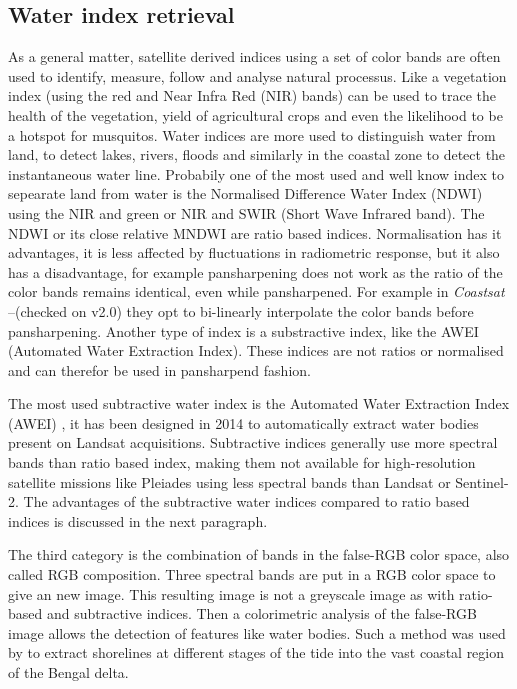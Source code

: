 \documentclass[remotesensing,article,submit,pdftex,moreauthors]{Definitions/mdpi}
\begin{document}
\subsection{Water index retrieval}
As a general matter, satellite derived indices using a set of color bands are often used to identify, measure, follow and analyse natural processus. Like a vegetation index (using the red and Near Infra Red (NIR) bands) can be used to trace the health of the vegetation, yield of agricultural crops and even the likelihood to be a hotspot for musquitos. Water indices are more used to distinguish water from land, to detect lakes, rivers, floods and similarly in the coastal zone to detect the instantaneous water line. Probabily one of the most used and well know index to sepearate land from water is the Normalised Difference Water Index (NDWI) using the NIR and green or NIR and SWIR (Short Wave Infrared band). The NDWI or its close relative MNDWI are ratio based indices. Normalisation has it advantages, it is less affected by fluctuations in radiometric response, but it also has a disadvantage, for example pansharpening does not work as the ratio of the color bands remains identical, even while pansharpened. For example in \textit{Coastsat} --(checked on v2.0) they opt to bi-linearly interpolate the color bands before pansharpening. Another type of index is a substractive index, like the AWEI (Automated Water Extraction Index). These indices are not ratios or normalised and can therefor be used in pansharpend fashion. 




The most used subtractive water index is the Automated Water Extraction Index (AWEI) \citep{FEYISA201423}, it has been designed in 2014 to automatically extract water bodies present on Landsat acquisitions.
Subtractive indices generally use more spectral bands than ratio based index, making them not available for high-resolution satellite missions like Pleiades using less spectral bands than Landsat or Sentinel-2.
The advantages of the subtractive water indices compared to ratio based indices is discussed in the next paragraph.








The third category is the combination of bands in the false-RGB color space, also called RGB composition.
Three spectral bands are put in a RGB color space to give an new image.
This resulting image is not a greyscale image as with ratio-based and subtractive indices.
Then a colorimetric analysis of the false-RGB image allows the detection of features like water bodies.\citep{PEKEL2014704}
Such a method was used by \citep{Khan2019} to extract shorelines at different stages of the tide into the vast coastal region of the Bengal delta. %
\par
\end{document}
